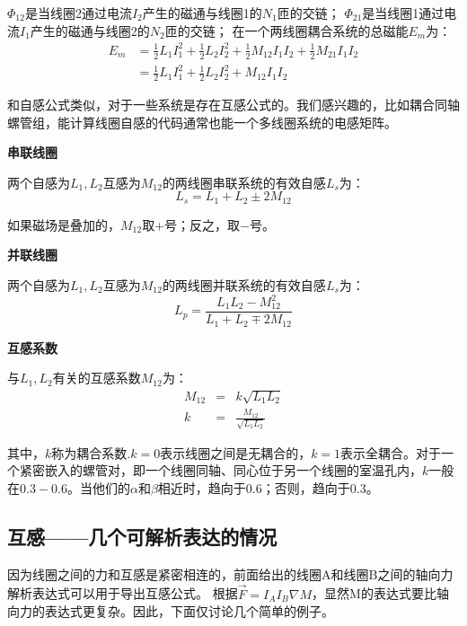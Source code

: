 $\Phi_{12}$是当线圈2通过电流$I_2$产生的磁通与线圈1的$N_1$匝的交链；
$\Phi_{21}$是当线圈1通过电流$I_1$产生的磁通与线圈2的$N_2$匝的交链；
在一个两线圈耦合系统的总磁能$E_m$为：
\begin{equation}
\begin{split}
E_m&=\frac{1}{2}L_1I_1^2+\frac{1}{2}L_2I_2^2+\frac{1}{2}M_{12}I_1I_2+\frac{1}{2}M_{21}I_1I_2\\
&= \frac{1}{2}L_1I_1^2+\frac{1}{2}L_2I_2^2+M_{12}I_1I_2%
\end{split}
\end{equation}

和自感公式类似，对于一些系统是存在互感公式的。我们感兴趣的，比如耦合同轴螺管组，能计算线圈自感的代码通常也能一个多线圈系统的电感矩阵。

\textbf{串联线圈} 
  
  两个自感为$L_1,L_2$互感为$M_{12}$的两线圈串联系统的有效自感$L_s$为：
  \begin{equation}
   L_s=L_1+L_2 \pm 2M_{12}%
  \end{equation}

如果磁场是叠加的，$M_{12}$取+号；反之，取−号。

\textbf{并联线圈} 

两个自感为$L_1,L_2$互感为$M_{12}$的两线圈并联系统的有效自感$L_s$为：
  \begin{equation}
L_p=\frac{L_1 L_2-M_{12}^2}{L_1+L_2 \mp 2M_{12}}%
\end{equation}

\textbf{互感系数} 

  与$L_1,L_2$有关的互感系数$M_{12}$为：
\begin{eqnarray}
M_{12}&=&k\sqrt{L_1L_2}\\%
k&=&\frac{M_{12}}{\sqrt{L_1L_2}}%
\end{eqnarray}

其中，$k$称为耦合系数.$k=0$表示线圈之间是无耦合的，$k=1$表示全耦合。对于一个紧密嵌入的螺管对，即一个线圈同轴、同心位于另一个线圈的室温孔内，$k$一般在$0.3-0.6$。当他们的$\alpha$和$\beta$相近时，趋向于0.6；否则，趋向于0.3。


\subsection{互感——几个可解析表达的情况}
因为线圈之间的力和互感是紧密相连的，前面给出的线圈A和线圈B之间的轴向力解析表达式可以用于导出互感公式。
根据$\vec{F}=I_A I_B \nabla M$，显然M的表达式要比轴向力的表达式更复杂。因此，下面仅讨论几个简单的例子。

